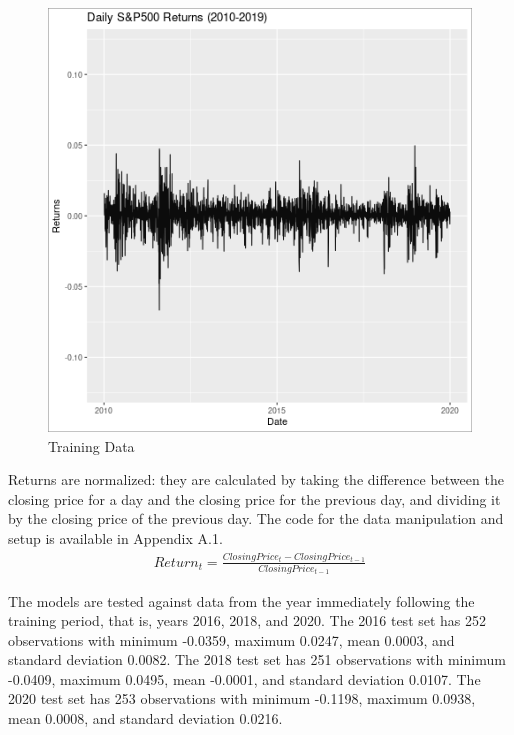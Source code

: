 \documentclass[12pt,letterpaper,reqno,fleqn]{article}
\begin{document}
\begin{figure}
\includegraphics[scale=.45]{plot1019}
\caption{Training Data}
\end{figure}

Returns are normalized: they are calculated by taking the difference between the closing price for a day and the closing price for the previous day, and dividing it by the closing price of the previous day. The code for the data manipulation and setup is available in Appendix A.1. 
\begin{align}
Return_{t} = \frac{ClosingPrice_{t} - ClosingPrice_{t-1}}{ClosingPrice_{t-1}} \nonumber
\end{align}

The models are tested against data from the year immediately following the training period, that is, years 2016, 2018, and 2020. The 2016 test set has 252 observations with minimum -0.0359, maximum 0.0247, mean 0.0003, and standard deviation 0.0082. The 2018 test set has 251 observations with minimum -0.0409, maximum 0.0495, mean -0.0001, and standard deviation 0.0107. The 2020 test set has 253 observations with minimum -0.1198, maximum 0.0938, mean 0.0008, and standard deviation 0.0216. 
\end{document}
